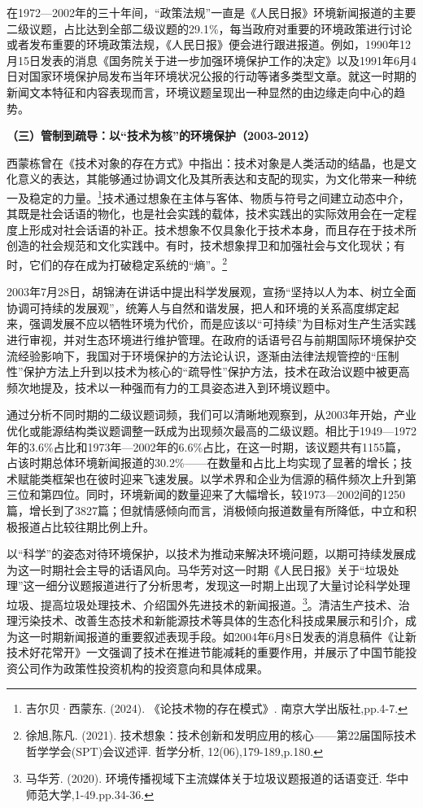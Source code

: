 在1972---2002年的三十年间，``政策法规''一直是《人民日报》环境新闻报道的主要二级议题，占比达到全部二级议题的29.1\%，每当政府对重要的环境政策进行讨论或者发布重要的环境政策法规，《人民日报》便会进行跟进报道。例如，1990年12月15日发表的消息《国务院关于进一步加强环境保护工作的决定》以及1991年6月4日对国家环境保护局发布当年环境状况公报的行动等诸多类型文章。就这一时期的新闻文本特征和内容表现而言，环境议题呈现出一种显然的由边缘走向中心的趋势。

\textbf{（三）管制到疏导：以``技术为核''的环境保护（2003-2012）}

西蒙栋曾在《技术对象的存在方式》中指出：技术对象是人类活动的结晶，也是文化意义的表达，其能够通过协调文化及其所表达和支配的现实，为文化带来一种统一及稳定的力量。\footnote{吉尔贝·西蒙东.
  (2024). 《论技术物的存在模式》. 南京大学出版社,pp.4-7.}技术通过想象在主体与客体、物质与符号之间建立动态中介，其既是社会话语的物化，也是社会实践的载体，技术实践出的实际效用会在一定程度上形成对社会话语的补正。技术想象不仅具象化于技术本身，而且存在于技术所创造的社会规范和文化实践中。有时，技术想象捍卫和加强社会与文化现状；有时，它们的存在成为打破稳定系统的``熵''。\footnote{徐旭,陈凡.
  (2021).
  技术想象：技术创新和发明应用的核心------第22届国际技术哲学学会(SPT)会议述评.
  哲学分析, 12(06),179-189,p.180.}

2003年7月28日，胡锦涛在讲话中提出科学发展观，宣扬``坚持以人为本、树立全面协调可持续的发展观''，统筹人与自然和谐发展，把人和环境的关系高度绑定起来，强调发展不应以牺牲环境为代价，而是应该以``可持续''为目标对生产生活实践进行审视，并对生态环境进行维护管理。在政府的话语号召与前期国际环境保护交流经验影响下，我国对于环境保护的方法论认识，逐渐由法律法规管控的``压制性''保护方法上升到以技术为核心的``疏导性''保护方法，技术在政治议题中被更高频次地提及，技术以一种强而有力的工具姿态进入到环境议题中。

通过分析不同时期的二级议题词频，我们可以清晰地观察到，从2003年开始，产业优化或能源结构类议题调整一跃成为出现频次最高的二级议题。相比于1949---1972年的3.6\%占比和1973年---2002年的6.6\%占比，在这一时期，该议题共有1155篇，占该时期总体环境新闻报道的30.2\%------在数量和占比上均实现了显著的增长；技术赋能类框架也在彼时迎来飞速发展。以学术界和企业为信源的稿件频次上升到第三位和第四位。同时，环境新闻的数量迎来了大幅增长，较1973---2002间的1250篇，增长到了3827篇；但就情感倾向而言，消极倾向报道数量有所降低，中立和积极报道占比较往期比例上升。

以``科学''的姿态对待环境保护，以技术为推动来解决环境问题，以期可持续发展成为这一时期社会主导的话语风向。马华芳对这一时期《人民日报》关于``垃圾处理''这一细分议题报道进行了分析思考，发现这一时期上出现了大量讨论科学处理垃圾、提高垃圾处理技术、介绍国外先进技术的新闻报道。\footnote{马华芳.
  (2020). 环境传播视域下主流媒体关于垃圾议题报道的话语变迁.
  华中师范大学,1-49.pp.34-36.}。清洁生产技术、治理污染技术、改善生态技术和新能源技术等具体的生态化科技成果展示和引介，成为这一时期新闻报道的重要叙述表现手段。如2004年6月8日发表的消息稿件《让新技术好花常开》一文强调了技术在推进节能减耗的重要作用，并展示了中国节能投资公司作为政策性投资机构的投资意向和具体成果。

